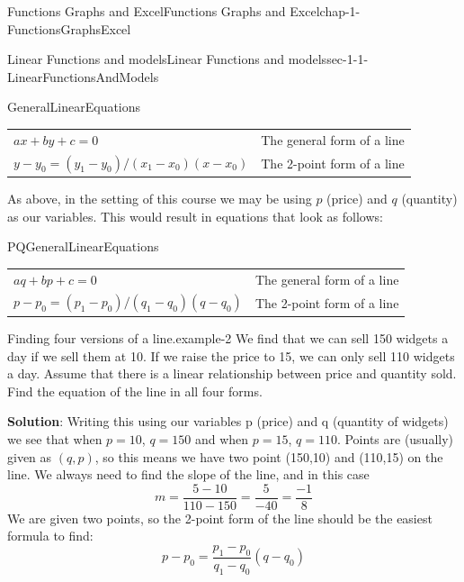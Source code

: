 \documentclass[oneside,10pt,]{book}
\newcommand{\terminology}[1]{\textbf{#1}}
\numberwithin{equation}{section}
\begin{document}
\begin{chapterptx}{Functions Graphs and Excel}{}{Functions Graphs and Excel}{}{}{chap-1-FunctionsGraphsExcel}
\begin{sectionptx}{Linear Functions and models}{}{Linear Functions and models}{}{}{sec-1-1-LinearFunctionsAndModels}
\begin{assemblage}{}{GeneralLinearEquations}
\begin{sidebyside}{1}{0}{0}{0}
\begin{sbspanel}{1}%
{\centering%
\begin{tabular}{ll}
\(a x+b y+c=0\)&The general form of a line\tabularnewline[0pt]
\(y-y_0=(y_1-y_0)/(x_1-x_0 )(x-x_0)\)&The 2-point form of a line
\end{tabular}
\par}
\end{sbspanel}%
\end{sidebyside}%
\end{assemblage}
\hypertarget{p-44}{}%
As above, in the setting of this course we may be using \(p\) (price) and \(q\) (quantity) as our variables. This would result in equations that look as follows:%
\begin{assemblage}{}{PQGeneralLinearEquations}%
\leavevmode%
\begin{sidebyside}{1}{0}{0}{0}%
\begin{sbspanel}{1}%
{\centering%
\begin{tabular}{ll}
\(a q+b p+c=0\)&The general form of a line\tabularnewline[0pt]
\(p-p_0=(p_1-p_0)/(q_1-q_0 )(q-q_0)\)&The 2-point form of a line
\end{tabular}
\par}
\end{sbspanel}%
\end{sidebyside}%
\end{assemblage}
\begin{example}{Finding four versions of a line.}{example-2}%
\hypertarget{p-45}{}%
We find that we can sell 150 widgets a day if we sell them at \textdollar{}10.  If we raise the price to \textdollar{}15, we can only sell 110 widgets a day.  Assume that there is a linear relationship between price and quantity sold.  Find the equation of the line in all four forms.%
\par
\hypertarget{p-46}{}%
\terminology{Solution}:  Writing this using our variables p (price) and q (quantity of widgets) we see that when \(p = 10\), \(q = 150\) and when \(p = 15\), \(q = 110\).  Points are (usually) given as \((q,p)\), so this means we have two point (150,10) and (110,15) on the line. We always need to find the slope of the line, and in this case%
\begin{equation*}
m=  \frac{5-10}{110-150}=  \frac{5}{-40}= \frac{-1}{8}
\end{equation*}
We are given two points, so the 2-point form of the line should be the easiest formula to find:%
\begin{equation*}
p-p_0=\frac{p_1-p_0}{q_1-q_0 }(q-q_0)

\end{equation*}
\end{example}
\end{sectionptx}
\end{chapterptx}
\end{document}
